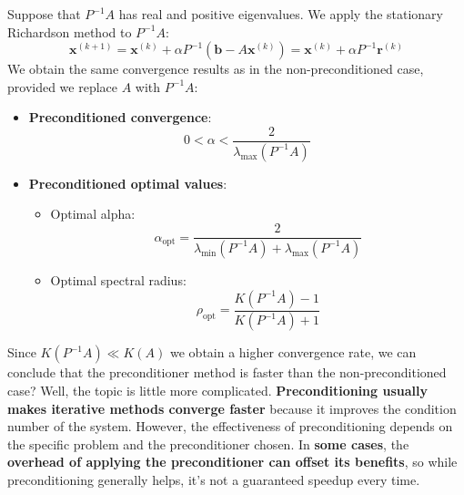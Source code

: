 \highspace
Suppose that $P^{-1}A$ has real and positive eigenvalues. We apply the stationary Richardson method to $P^{-1}A$:
\begin{equation}\label{eq: stationary richardson with preconditioner}
    \mathbf{x}^{\left(k+1\right)} = \mathbf{x}^{\left(k\right)} + \alpha P^{-1}\left(\mathbf{b} - A \mathbf{x}^{\left(k\right)}\right) = \mathbf{x}^{\left(k\right)} + \alpha P^{-1}\mathbf{r}^{\left(k\right)}
\end{equation}
We obtain the same convergence results as in the non-preconditioned case, provided we replace $A$ with $P^{-1}A$:
\begin{itemize}
    \item \textbf{Preconditioned convergence}:
    \begin{equation}
        0 < \alpha < \dfrac{2}{\lambda_{\max}\left(P^{-1}A\right)}
    \end{equation}

    \item \textbf{Preconditioned optimal values}:
    \begin{itemize}
        \item Optimal alpha:
        \begin{equation}
            \alpha_{\text{opt}} = \dfrac{2}{\lambda_{\min}\left(P^{-1}A\right) + \lambda_{\max}\left(P^{-1}A\right)}
        \end{equation}

        \item Optimal spectral radius:
        \begin{equation}
            \rho_{\text{opt}} = \dfrac{
                K\left(P^{-1}A\right)-1
            }{
                K\left(P^{-1}A\right)+1
            }
        \end{equation}
    \end{itemize}
\end{itemize}
Since $K\left(P^{-1}A\right) \ll K\left(A\right)$ we obtain a higher convergence rate, we can conclude that the preconditioner method is faster than the non-preconditioned case? Well, the topic is little more complicated. \textbf{Preconditioning usually makes iterative methods converge faster} because it improves the condition number of the system. However, the effectiveness of preconditioning depends on the specific problem and the preconditioner chosen. In \textbf{some cases}, the \textbf{overhead of applying the preconditioner can offset its benefits}, so while preconditioning generally helps, it's not a guaranteed speedup every time.

